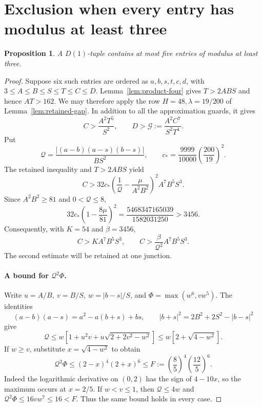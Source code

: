 \documentclass[12pt]{article}
\newtheorem{proposition}[theorem]{Proposition}
\numberwithin{equation}{section}
\begin{document}
\section{Exclusion when every entry has modulus at least three}
\label{sec:all-large}

\begin{proposition}\label{prop:no-all-large-six}
A \(D(1)\)-tuple contains at most five entries of modulus at least three.
\end{proposition}
\begin{proof}
Suppose six such entries are ordered as \(a,b,s,t,c,d\), with
\(3\le A\le B\le S\le T\le C\le D\).
Lemma~\ref{lem:product-four} gives \(T>2ABS\) and hence \(AT>162\).
We may therefore apply the row \(H=48,\lambda=19/200\) of
Lemma~\ref{lem:retained-gap}. In addition to all the approximation guards,
it gives
\begin{equation}\label{eq:integrated-6}
C>\frac{A^2T^5}{S^2},\qquad
 D>\mathcal G:=\frac{A^2C^7}{S^2T^4}.
\end{equation}
Put
\[
 \mathcal Q=\frac{|(a-b)(a-s)(b-s)|}{BS^2},\qquad
 c_*=\frac{9999}{10000}\left(\frac{200}{19}\right)^2.
\]
The retained inequality and \(T>2ABS\) yield
\[
 C>32c_*\left(\frac1{\mathcal Q}-\frac{\mu}{A^2B^2}\right)^2
                         A^7B^5S^3.
\]
Since \(A^2B^2\ge81\) and \(0<\mathcal Q\le8\),
\[
 32c_*\left(1-\frac{8\mu}{81}\right)^2
 =\frac{5468347165039}{1582031250}>3456.
\]
Consequently, with \(K=54\) and \(\beta=3456\),
\begin{equation}\label{eq:large-gap}
 C>K A^7B^5S^3,\qquad
 C>\frac{\beta}{\mathcal Q^2}A^7B^5S^3.
\end{equation}
The second estimate will be retained at one junction.

\paragraph{A bound for $\mathcal Q^2\Phi$.}
Write \(u=A/B,\ v=B/S,\ w=|b-s|/S\), and
\(\Phi=\max(w^6,vw^5)\). The identities
\[
 (a-b)(a-s)=a^2-a(b+s)+bs,\qquad
 |b+s|^2=2B^2+2S^2-|b-s|^2
\]
give
\[
 \mathcal Q\le w[1+u^2v+u\sqrt{2+2v^2-w^2}]
 \le w[2+\sqrt{4-w^2}].
\]
If \(w\ge v\), substitute \(x=\sqrt{4-w^2}\) to obtain
\[
 \mathcal Q^2\Phi\le(2-x)^4(2+x)^6
 \le F:=\left(\frac85\right)^4\left(\frac{12}{5}\right)^6.
\]
Indeed the logarithmic derivative on \((0,2)\) has the sign of
\(4-10x\), so the maximum occurs at \(x=2/5\).
If \(w<v\le1\), then \(\mathcal Q\le4w\) and
\(\mathcal Q^2\Phi\le16vw^7\le16<F\).
Thus the same bound holds in every case.


\end{proof}
\end{document}
